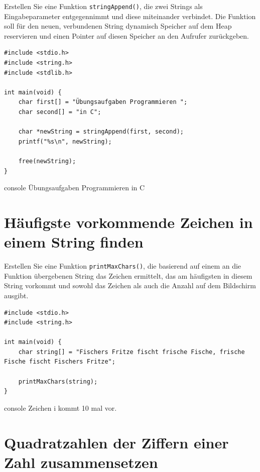 Erstellen Sie eine Funktion \texttt{stringAppend()}, die zwei Strings als
Eingabeparameter entgegennimmt und diese miteinander verbindet. Die Funktion
soll für den neuen, verbundenen String dynamisch Speicher auf dem Heap
reservieren und einen Pointer auf diesen Speicher an den Aufrufer zurückgeben.

\Vorlage
\begin{verbatim}
#include <stdio.h>
#include <string.h>
#include <stdlib.h>

int main(void) {
    char first[] = "Übungsaufgaben Programmieren ";
    char second[] = "in C";

    char *newString = stringAppend(first, second);
    printf("%s\n", newString);

    free(newString);
}
\end{verbatim}

\begin{mybox}[Bildschirmausgabe]{console}
Übungsaufgaben Programmieren in C
\end{mybox}





\chapter{Häufigste vorkommende Zeichen in einem String finden}

\vspace{10pt}

Erstellen Sie eine Funktion \texttt{printMaxChars()}, die basierend auf
einem an die Funktion übergebenen String das Zeichen ermittelt, das am
häufigsten in diesem String vorkommt und sowohl das Zeichen als auch die Anzahl
auf dem Bildschirm ausgibt.

\Vorlage
\begin{verbatim}
#include <stdio.h>
#include <string.h>

int main(void) {
    char string[] = "Fischers Fritze fischt frische Fische, frische Fische fischt Fischers Fritze";

    printMaxChars(string);
}
\end{verbatim}

\begin{mybox}[Bildschirmausgabe]{console}
Zeichen i kommt 10 mal vor.
\end{mybox}





\chapter{Quadratzahlen der Ziffern einer Zahl zusammensetzen}

